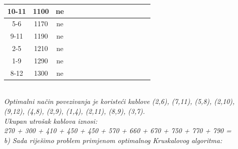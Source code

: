 \documentclass[12pt]{article}
\begin{document}
\begin{enumerate}
\begin{center}
\begin{tabular}{|c|c|c|c|c|c|c|c|c|c|c|c|c|c|c|}
10-11 & 1100 & ne &  &  &  &  &  &  &  &  &  &  &  &  \\ \hline
5-6 & 1170 & ne &  &  &  &  &  &  &  &  &  &  &  &  \\ \hline
9-11 & 1190 & ne &  &  &  &  &  &  &  &  &  &  &  &  \\ \hline
2-5 & 1210 & ne &  &  &  &  &  &  &  &  &  &  &  &  \\ \hline
1-9 & 1290 & ne &  &  &  &  &  &  &  &  &  &  &  &  \\ \hline
8-12 & 1300 & ne &  &  &  &  &  &  &  &  &  &  &  &  \\ \hline
\end{tabular}


\vspace{0.5cm}
\textit{\\Optimalni način povezivanja je koristeći kablove (2,6), (7,11), (5,8), (2,10), (9,12), (4,8), (2,9), (1,4), (2,11), (8,9),  (3,7).\\Ukupan utrošak kablova iznosi:\\ 270 + 300 + 410 + 450 + 450 + 570 + 660 + 670 + 750 + 770 + 790 = }\\
\vspace{0.3cm}
\textit{b) Sada riješimo problem primjenom optimalnog Kruskalovog algoritma:\\}


\end{center}
\end{enumerate}
\end{document}
